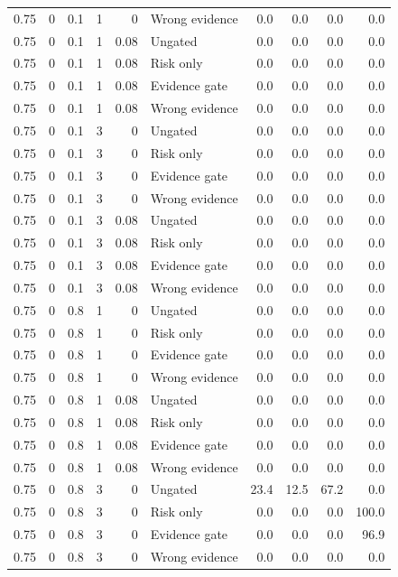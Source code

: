 \begin{longtable}{rrrrrlrrrr}
0.75 & 0 & 0.1 & 1 & 0 & Wrong evidence & 0.0 & 0.0 & 0.0 & 0.0\\
0.75 & 0 & 0.1 & 1 & 0.08 & Ungated & 0.0 & 0.0 & 0.0 & 0.0\\
0.75 & 0 & 0.1 & 1 & 0.08 & Risk only & 0.0 & 0.0 & 0.0 & 0.0\\
0.75 & 0 & 0.1 & 1 & 0.08 & Evidence gate & 0.0 & 0.0 & 0.0 & 0.0\\
0.75 & 0 & 0.1 & 1 & 0.08 & Wrong evidence & 0.0 & 0.0 & 0.0 & 0.0\\
0.75 & 0 & 0.1 & 3 & 0 & Ungated & 0.0 & 0.0 & 0.0 & 0.0\\
0.75 & 0 & 0.1 & 3 & 0 & Risk only & 0.0 & 0.0 & 0.0 & 0.0\\
0.75 & 0 & 0.1 & 3 & 0 & Evidence gate & 0.0 & 0.0 & 0.0 & 0.0\\
0.75 & 0 & 0.1 & 3 & 0 & Wrong evidence & 0.0 & 0.0 & 0.0 & 0.0\\
0.75 & 0 & 0.1 & 3 & 0.08 & Ungated & 0.0 & 0.0 & 0.0 & 0.0\\
0.75 & 0 & 0.1 & 3 & 0.08 & Risk only & 0.0 & 0.0 & 0.0 & 0.0\\
0.75 & 0 & 0.1 & 3 & 0.08 & Evidence gate & 0.0 & 0.0 & 0.0 & 0.0\\
0.75 & 0 & 0.1 & 3 & 0.08 & Wrong evidence & 0.0 & 0.0 & 0.0 & 0.0\\
0.75 & 0 & 0.8 & 1 & 0 & Ungated & 0.0 & 0.0 & 0.0 & 0.0\\
0.75 & 0 & 0.8 & 1 & 0 & Risk only & 0.0 & 0.0 & 0.0 & 0.0\\
0.75 & 0 & 0.8 & 1 & 0 & Evidence gate & 0.0 & 0.0 & 0.0 & 0.0\\
0.75 & 0 & 0.8 & 1 & 0 & Wrong evidence & 0.0 & 0.0 & 0.0 & 0.0\\
0.75 & 0 & 0.8 & 1 & 0.08 & Ungated & 0.0 & 0.0 & 0.0 & 0.0\\
0.75 & 0 & 0.8 & 1 & 0.08 & Risk only & 0.0 & 0.0 & 0.0 & 0.0\\
0.75 & 0 & 0.8 & 1 & 0.08 & Evidence gate & 0.0 & 0.0 & 0.0 & 0.0\\
0.75 & 0 & 0.8 & 1 & 0.08 & Wrong evidence & 0.0 & 0.0 & 0.0 & 0.0\\
0.75 & 0 & 0.8 & 3 & 0 & Ungated & 23.4 & 12.5 & 67.2 & 0.0\\
0.75 & 0 & 0.8 & 3 & 0 & Risk only & 0.0 & 0.0 & 0.0 & 100.0\\
0.75 & 0 & 0.8 & 3 & 0 & Evidence gate & 0.0 & 0.0 & 0.0 & 96.9\\
0.75 & 0 & 0.8 & 3 & 0 & Wrong evidence & 0.0 & 0.0 & 0.0 & 0.0\\

\end{longtable}
